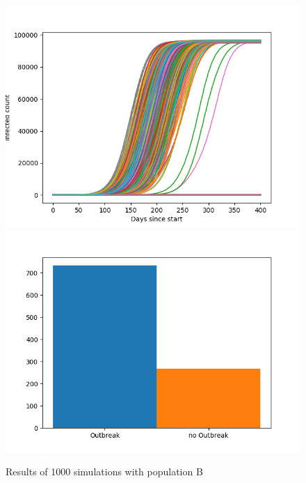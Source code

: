 \documentclass[runningheads]{llncs}
\begin{document}
\begin{figure}
	\includegraphics[width=\textwidth]{outbreaks_populationB.png}
	\includegraphics[width=\textwidth]{barchart_populationB.png}
	\caption{Results of 1000 simulations with population B}
\end{figure}
\newpage
\noindent
\end{document}
